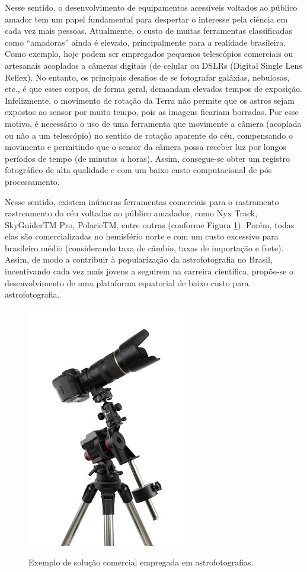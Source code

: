 Nesse sentido, o desenvolvimento de equipamentos acessíveis voltados ao público amador tem um papel fundamental para despertar o interesse pela ciência em cada vez mais pessoas. Atualmente, o custo de muitas ferramentas classificadas como “amadoras” ainda é elevado, principalmente para a realidade brasileira. Como exemplo, hoje podem ser empregados pequenos telescópios comerciais ou artesanais acoplados a câmeras digitais (de celular ou DSLRs (Digital Single Lens Reflex). No entanto, os principais desafios de se fotografar galáxias, nebulosas, etc., é que esses corpos, de forma geral, demandam elevados tempos de exposição.\cite{site:introCabau} Infelizmente, o movimento de rotação da Terra não permite que os astros sejam expostos ao sensor por muito tempo, pois as imagens ficariam borradas. Por esse motivo, é necessário o uso de uma ferramenta que movimente a câmera (acoplada ou não a um telescópio) no sentido de rotação aparente do céu, compensando o movimento e permitindo que o sensor da câmera possa receber luz por longos períodos de tempo (de minutos a horas).\cite{site:introCabau} Assim, consegue-se obter um registro fotográfico de alta qualidade e com um baixo custo computacional de pós processamento.


Nesse sentido, existem inúmeras ferramentas comerciais para o rastramento rastreamento do céu voltadas ao público amadador, como Nyx Track, SkyGuiderTM Pro, PolarieTM, entre outras (conforme Figura \ref{fig:skyguider}). Porém, todas elas são comercializadas no hemisfério norte e com um custo excessivo para brasileiro médio (considerando taxa de câmbio, taxas de importação e frete). Assim, de modo a contribuir à popularização da astrofotografia no Brasil, incentivando cada vez mais jovens a seguirem na carreira científica, propõe-se o desenvolvimento de uma plataforma equatorial de baixo custo para astrofotografia.


\begin{figure}[htb]
	\centering
	\caption{Exemplo de solução comercial empregada em astrofotografias. }
	\includegraphics[width=0.3\linewidth]{figuras/skyguider}
	\label{fig:skyguider}
\end{figure}
